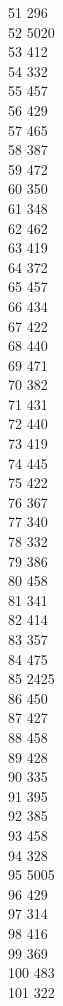 { 51	296 \\
 52	5020 \\
 53	412 \\
 54	332 \\
 55	457 \\
 56	429 \\
 57	465 \\
 58	387 \\
 59	472 \\
 60	350 \\
 61	348 \\
 62	462 \\
 63	419 \\
 64	372 \\
 65	457 \\
 66	434 \\
 67	422 \\
 68	440 \\
 69	471 \\
 70	382 \\
 71	431 \\
 72	440 \\
 73	419 \\
 74	445 \\
 75	422 \\
 76	367 \\
 77	340 \\
 78	332 \\
 79	386 \\
 80	458 \\
 81	341 \\
 82	414 \\
 83	357 \\
 84	475 \\
 85	2425 \\
 86	450 \\
 87	427 \\
 88	458 \\
 89	428 \\
 90	335 \\
 91	395 \\
 92	385 \\
 93	458 \\
 94	328 \\
 95	5005 \\
 96	429 \\
 97	314 \\
 98	416 \\
 99	369 \\
 100	483 \\
 101	322 \\
}

